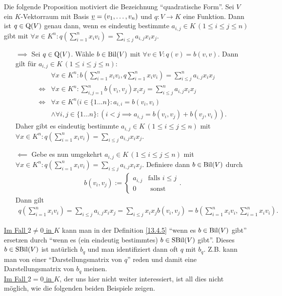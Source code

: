 \documentclass[../../main.tex]{subfiles}
\begin{document}
\begin{pro}\label{13.4.7}
	Die folgende Proposition motiviert die Bezeichnung \enquote{quadratische Form}. Sei $V$ ein $K$-Vektorraum mit Basis ${\underline v}=(v_1,\ldots ,v_n)$ und $q: V\to K$ eine Funktion. Dann ist $q\in \operatorname{Q}(V)$ genau dann, wenn es eindeutig bestimmte $a_{i,j}\in K\, (1\le i\le j\le n)$ gibt mit $\forall x\in K^n: q\left(\sum_{i=1}^nx_iv_i\right)=\sum_{i\le j}a_{i,j}x_ix_j$.
\end{pro}
\begin{cproof}
	\begin{itemize}
		\item[$\implies$] Sei $q\in \operatorname{Q}(V)$. Wähle $b\in \operatorname{Bil}(V)$ mit $\forall v\in V: q(v)=b(v,v)$. Dann gilt für $a_{i,j}\in K\, (1\le i\le j\le n)$:
		\begin{align*}
			&\forall x\in K^n: b\left(\sum_{i=1}^n x_iv_i, q \sum_{i=1}^n x_iv_i\right)=\sum_{i\le j}^n a_{i,j}x_ix_j\\
			\Longleftrightarrow&\forall x\in K^n:\sum_{i,j=1}^n b(v_i,v_j)x_ix_j=\sum_{i\le j}^n a_{i,j}x_ix_j\\
			\Longleftrightarrow&\forall x\in K^n (i\in\{1\ldots n\}: a_{i,i}=b(v_i,v_i)\\
			&\land \forall i,j\in\{1\ldots n\}: (i<j\implies a_{i,j}=b(v_i,v_j)+b(v_j,v_i)).
		\end{align*}
		Daher gibt es eindeutig bestimmte $a_{i,j}\in K\, (1\le i\le j\le n)$ mit $\forall x\in K^n: q\left(\sum_{i=1}^nx_iv_i\right)=\sum_{i\le j}a_{i,j}x_ix_j$.
		\item[$\impliedby$] Gebe es nun umgekehrt $a_{i,j}\in K\, (1\le i\le j\le n)$ mit $\forall x\in K^n: q\left(\sum_{i=1}^nx_iv_i\right)=\sum_{i\le j}a_{i,j}x_ix_j$. Definiere dann $b\in \operatorname{Bil}(V)$ durch
		\begin{align*}
			b(v_i,v_j):=\begin{cases}a_{i,j} & \text{falls }i\le j\\ 0 & \text{ sonst}\end{cases}.
		\end{align*}
		Dann gilt
		\begin{align*}
			q\left(\sum_{i=1}^nx_iv_i\right)=\sum_{i\le j}a_{i,j}x_ix_j=\sum_{i\le j}x_ix_jb(v_i,v_j)=b\left(\sum_{i=1}^n x_iv_i,\sum_{i=1}	^nx_iv_i\right).
		\end{align*}
	\end{itemize}
\end{cproof}

\begin{bem}\label{13.4.8}
	\underline{Im Fall $2\neq 0$ in $K$} kann man in der Definition \ref{13.4.5} \enquote{wenn es $b\in \operatorname{Bil}(V)$ gibt} ersetzen durch \enquote{wenn es (ein eindeutig bestimmtes) $b\in \operatorname{SBil}(V)$ gibt}. Dieses $b\in \operatorname{SBil}(V)$ ist natürlich $b_q$ und man identifiziert dann oft $q$ mit $b_q$. Z.B. kann man von einer \enquote{Darstellungsmatrix von $q$} reden und damit eine Darstellungsmatrix von $b_q$ meinen.\\
	
	\noindent\underline{Im Fall $2=0$ in $K$}, der uns hier nicht weiter interessiert, ist all dies nicht möglich, wie die folgenden beiden Beispiele zeigen.
\end{bem}
	
\end{document}
